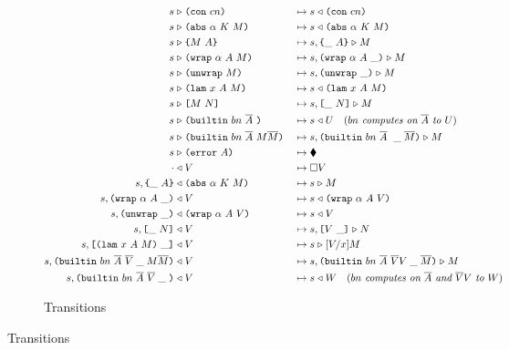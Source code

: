 \begin{figure}[!ht]
\begin{subfigure}[c]{\linewidth}   %
{\small
\caption{Transitions}
     \begin{alignat*}{2}
      s &\compute \con{cn}                 &{}\mapsto{}& s \return \con{cn}\\
      s &\compute \abs{\alpha}{K}{M}       &{}\mapsto{}& s \return \abs{\alpha}{K}{M}\\
      s &\compute \inst{M}{A}              &{}\mapsto{}& s,\inInstLeftFrame{A} \compute M\\
      s &\compute \wrap{\alpha}{A}{M}      &{}\mapsto{}& s,\inWrapRightFrame{\alpha}{A} \compute M\\
      s &\compute \unwrap{M}               &{}\mapsto{}& s,\inUnwrapFrame{} \compute M\\
      s &\compute \lam{x}{A}{M}            &{}\mapsto{}& s \return \lam{x}{A}{M}\\
      s &\compute \app{M}{N}               &{}\mapsto{}& s,\inAppLeftFrame{N} \compute M\\
      s &\compute \builtin{bn}{\repetition{A}}{} &{}\mapsto{}& 
                                      s \return U \quad (\textit{$bn$ computes on $\repetition{A}$ to $U$})\\
      s &\compute \builtin{bn}{\repetition{A}}{M \repetition{M}} &{}\mapsto{}& 
                                      s,\inBuiltin{bn}{\repetition{A}}{}{\_}{\repetition{M}} \compute {M}\\
      s &\compute \error{A} &{}\mapsto{}& \ckerror{}\\
      \cdot &\return V &{}\mapsto{}& \square V\\
      s,\inInstLeftFrame{A} &\return \abs{\alpha}{K}{M} &{}\mapsto{}& s \compute{M} \\
      s,\inWrapRightFrame{\alpha}{A} &\return V         &{}\mapsto{}& s \return \wrap{\alpha}{A}{V}\\
      s,\inUnwrapFrame{} &\return {\wrap{\alpha}{A}{V}} &{}\mapsto{}& s \return V\\
      s,\inAppLeftFrame{N} &\return V                   &{}\mapsto{}& s, \inAppRightFrame{V} \compute N\\
      s,\inAppRightFrame{\lam{x}{A}{M}} &\return V      &{}\mapsto{}& s \compute \subst{V}{x}{M}\\
      s,  \inBuiltin{bn}{\repetition{A}}{\repetition{V}}{\_}{M \repetition{M}} &\return V &{}\mapsto{}& s, \inBuiltin{bn}{\repetition{A}}{\repetition{V} V}{\_}{\repetition{M}} \compute M\\
      s,\inBuiltin{bn}{\repetition{A}}{\repetition{V}}{\_}{} &\return V &{}\mapsto{}& s \return W \quad (\textit{$bn$ computes on $\repetition{A}$ and $\repetition{V}V$ to $W$})\\
    \end{alignat*}
}
\end{subfigure}
\end{figure}


